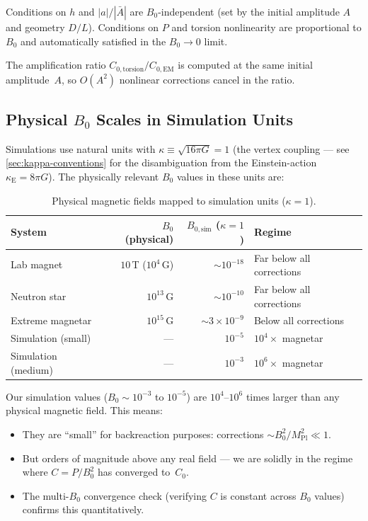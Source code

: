 Conditions on $h$ and $|a|/|\bar{A}|$ are $B_0$-independent (set by the
initial amplitude $A$ and geometry $D/L$).  Conditions on $P$ and torsion
nonlinearity are proportional to $B_0$ and automatically satisfied in the
$B_0 \to 0$ limit.

The amplification ratio $C_{0,\text{torsion}}/C_{0,\text{EM}}$ is computed
at the same initial amplitude~$A$, so $O(A^2)$ nonlinear corrections cancel
in the ratio.


\subsection{Physical $B_0$ Scales in Simulation Units}
\label{sec:bv-physical-scales}

Simulations use natural units with $\kappa \equiv \sqrt{16\pi G} = 1$ (the vertex coupling — see \cref{sec:kappa-conventions} for the disambiguation from the Einstein-action $\kappa_\text{E} = 8\pi G$).
The physically relevant $B_0$ values in these units are:

\begin{table}[htbp]
\centering
\caption{Physical magnetic fields mapped to simulation units ($\kappa = 1$).}
\label{tab:bv-physical-b0}
\begin{tabular}{@{}lrrl@{}}
\toprule
System & $B_0$ (physical) & $B_{0,\text{sim}}$ ($\kappa = 1$) & Regime \\
\midrule
Lab magnet          & $10\,$T ($10^4\,$G)     & $\sim 10^{-18}$ & Far below all corrections \\
Neutron star        & $10^{13}\,$G            & $\sim 10^{-10}$ & Far below all corrections \\
Extreme magnetar    & $10^{15}\,$G            & $\sim 3 \times 10^{-9}$ & Below all corrections \\
\midrule
Simulation (small)  & ---                     & $10^{-5}$       & $10^4 \times$ magnetar \\
Simulation (medium) & ---                     & $10^{-3}$       & $10^6 \times$ magnetar \\
\bottomrule
\end{tabular}
\end{table}

Our simulation values ($B_0 \sim 10^{-3}$ to $10^{-5}$) are
$10^4$--$10^6$ times larger than any physical magnetic field.  This means:
\begin{itemize}
  \item They are ``small'' for backreaction purposes: corrections
    $\sim B_0^2/M_\mathrm{Pl}^2 \ll 1$.
  \item But orders of magnitude above any real field --- we are solidly
    in the regime where $C = P/B_0^2$ has converged to~$C_0$.
  \item The multi-$B_0$ convergence check (verifying $C$ is constant
    across $B_0$ values) confirms this quantitatively.
\end{itemize}


